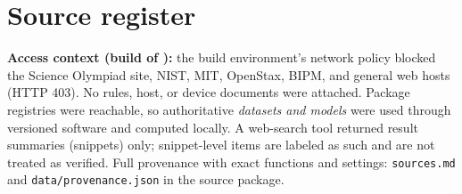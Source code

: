 \section{Source register}\label{sec:sources}
\textbf{Access context (build of \builddate):} the build environment's network policy blocked the Science Olympiad site, NIST, MIT, OpenStax, BIPM, and general web hosts (HTTP 403). No rules, host, or device documents were attached. Package registries were reachable, so authoritative \emph{datasets and models} were used through versioned software and computed locally. A web-search tool returned result summaries (snippets) only; snippet-level items are labeled as such and are not treated as verified. Full provenance with exact functions and settings: \texttt{sources.md} and \texttt{data/provenance.json} in the source package.

